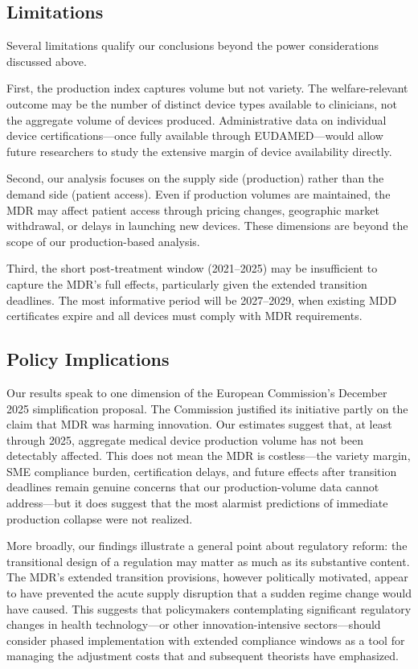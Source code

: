 \documentclass[12pt]{article}
\begin{document}
\subsection{Limitations}

Several limitations qualify our conclusions beyond the power considerations discussed above.

First, the production index captures volume but not variety. The welfare-relevant outcome may be the number of distinct device types available to clinicians, not the aggregate volume of devices produced. Administrative data on individual device certifications---once fully available through EUDAMED---would allow future researchers to study the extensive margin of device availability directly.

Second, our analysis focuses on the supply side (production) rather than the demand side (patient access). Even if production volumes are maintained, the MDR may affect patient access through pricing changes, geographic market withdrawal, or delays in launching new devices. These dimensions are beyond the scope of our production-based analysis.

Third, the short post-treatment window (2021--2025) may be insufficient to capture the MDR's full effects, particularly given the extended transition deadlines. The most informative period will be 2027--2029, when existing MDD certificates expire and all devices must comply with MDR requirements.

\subsection{Policy Implications}

Our results speak to one dimension of the European Commission's December 2025 simplification proposal. The Commission justified its initiative partly on the claim that MDR was harming innovation. Our estimates suggest that, at least through 2025, aggregate medical device production volume has not been detectably affected. This does not mean the MDR is costless---the variety margin, SME compliance burden, certification delays, and future effects after transition deadlines remain genuine concerns that our production-volume data cannot address---but it does suggest that the most alarmist predictions of immediate production collapse were not realized.

More broadly, our findings illustrate a general point about regulatory reform: the transitional design of a regulation may matter as much as its substantive content. The MDR's extended transition provisions, however politically motivated, appear to have prevented the acute supply disruption that a sudden regime change would have caused. This suggests that policymakers contemplating significant regulatory changes in health technology---or other innovation-intensive sectors---should consider phased implementation with extended compliance windows as a tool for managing the adjustment costs that \citet{peltzman1976toward} and subsequent theorists have emphasized.
\end{document}
